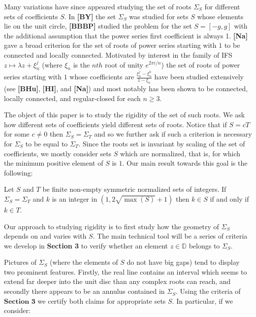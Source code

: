 \documentclass[11pt]{amsart}
\numberwithin{theorem}{section} %
\numberwithin{corollary}{section}
\numberwithin{lemma}{section}
\numberwithin{proposition}{section}
\numberwithin{definition}{section}
\newenvironment{customthm}[1]
	{\renewcommand\theinnercustomthm{#1}\innercustomthm}
	{\endinnercustomthm}
\begin{document}
Many variations have since appeared studying the set of roots $\Sigma_S$ for different sets of coefficients $S$. In \textbf{[BY]} the set $\Sigma_S$ was studied for sets $S$ whose elements lie on the unit circle, \textbf{[BBBP]} studied the problem for the set $S = [-g, g]$ with the additional assumption that the power series first coefficient is always 1. \textbf{[Na]} gave a broad criterion for the set of roots of power series starting with $1$ to be connected and locally connected. Motivated by interest in the family of IFS $z \mapsto \lambda z + \xi^j_n$ (where $\xi_n$ is the $nth$ root of unity $e^{2\pi i / n}$) the set of roots of power series starting with $1$ whose coefficients are $\frac{\xi_n^j - \xi_n^k}{1-\xi_n}$ have been studied extensively (see \textbf{[BHu]}, \textbf{[HI]}, and \textbf{[Na]}) and most notably has been shown to be connected, locally connected, and regular-closed for each $n \geqslant 3$.

The object of this paper is to study the rigidity of the set of such roots. We ask how different sets of coefficients yield different sets of roots. Notice that if $S = cT$ for some $c \neq 0$ then $\Sigma_S = \Sigma_T$ and so we further ask if such a criterion is necessary for $\Sigma_S$ to be equal to $\Sigma_T$. Since the roots set is invariant by scaling of the set of coefficients, we mostly consider sets $S$ which are normalized, that is, for which the minimum positive element of $S$ is $1$. Our main result towards this goal is the following:



\begin{customthm}{\ref{weakrigidity}}
Let $S$ and $T$ be finite non-empty symmetric normalized sets of integers. If $\Sigma_S = \Sigma_T$ and $k$ is an integer in $(1, 2\sqrt{\max(S)}+1)$ then $k\in S$ if and only if $k \in T$.
\end{customthm}




Our approach to studying rigidity is to first study how the geometry of $\Sigma_S$ depends on and varies with $S$. The main technical tool will be a series of criteria we develop in \textbf{Section 3} to verify whether an element $z \in \mathbb{D}$ belongs to $\Sigma_S$. 

Pictures of $\Sigma_S$ (where the elements of $S$ do not have big gaps) tend to display two prominent features. Firstly, the real line contains an interval which seems to extend far deeper into the unit disc than any complex roots can reach, and secondly there appears to be an annulus contained in $\Sigma_S$. Using the criteria of $\textbf{Section 3}$ we certify both claims for appropriate sets $S$. In particular, if we consider:
\end{document}
